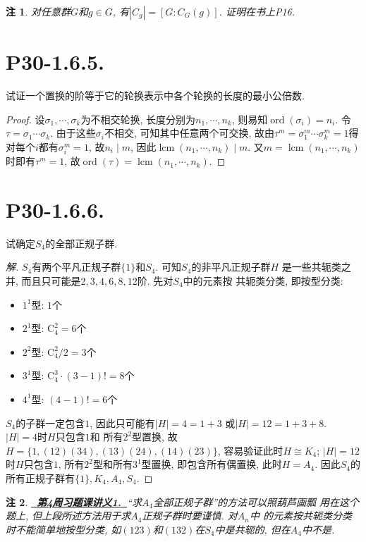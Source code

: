 \documentclass[12pt, a4paper, fontset=windows]{ctexart}
\newcommand{\abs}[1]{\left|{#1}\right|}
\newcommand{\isom}{\cong} %
\newcommand{\lcm}{\operatorname{lcm}}
\newcommand{\myref}[2][]{\hyperref[#1]{\bf\color{blue}\ {#2}\ }}
\newcommand{\ord}{\operatorname{ord}}
\newcommand{\yh}[1]{“{#1}”} %
\newtheorem*{remark}{注}
\newenvironment{solution}{\begin{proof}[解]}{\end{proof}}
\begin{document}
\begin{remark}
对任意群$G$和$g\in G$, 有$\abs{C_g}=[G:C_G(g)]$. 证明在书上{\rm P16.\cite{jsds}}
\end{remark}

\section*{P30-1.6.5.}

试证一个置换的阶等于它的轮换表示中各个轮换的长度的最小公倍数. 

\begin{proof}
设$\sigma_1,\cdots,\sigma_k$为不相交轮换, 长度分别为$n_1,\cdots,n_k$, 
则易知$\ord(\sigma_i)=n_i$. 令$\tau=\sigma_1\cdots\sigma_k$. 
由于这些$\sigma_i$不相交, 可知其中任意两个可交换, 
故由$\tau^m=\sigma_1^m\cdots\sigma_k^m=1$得
对每个$i$都有$\sigma_i^m=1$, 故$n_i\mid m$, 
因此$\lcm(n_1,\cdots,n_k)\mid m$. 又$m=\lcm(n_1,\cdots,n_k)$
时即有$\tau^m=1$, 故$\ord(\tau)=\lcm(n_1,\cdots,n_k)$. 
\end{proof}

\section*{P30-1.6.6.}

试确定$S_4$的全部正规子群. 

\begin{solution}
$S_4$有两个平凡正规子群$\{1\}$和$S_4$. 可知$S_4$的非平凡正规子群$H$
是一些共轭类之并, 而且只可能是$2,3,4,6,8,12$阶. 先对$S_4$中的元素按
共轭类分类, 即按型分类: 
\begin{itemize}[itemsep=0pt]
    \item $1^1$型: $1$个
    \item $2^1$型: $\mathrm{C}^2_4=6$个
    \item $2^2$型: $\mathrm{C}^2_4/2=3$个
    \item $3^1$型: $\mathrm{C}^3_4\cdot(3-1)!=8$个
    \item $4^1$型: $(4-1)!=6$个
\end{itemize}

$S_4$的子群一定包含$1$, 因此只可能有$\abs{H}=4=1+3$
或$\abs{H}=12=1+3+8$. $\abs{H}=4$时$H$只包含$1$和
所有$2^2$型置换, 故$H=\{1,(12)(34),
(13)(24),(14)(23)\}$, 容易验证此时$H\isom K_4$; 
$\abs{H}=12$时$H$只包含$1$, 所有$2^2$型和所有$3^1$型置换, 
即包含所有偶置换, 此时$H=A_4$. 
因此$S_4$的所有正规子群有$\{1\},K_4,A_4,S_4$. 
\end{solution}

\begin{remark}
\myref[A4-lhd]{第4周习题课讲义1.}\yh{求$A_4$全部正规子群}的方法可以照葫芦画瓢
用在这个题上, 但上段所述方法用于求$A_4$正规子群时要谨慎. 对$A_n$中
的元素按共轭类分类时不能简单地按型分类, 
如$(123)$和$(132)$在$S_4$中是共轭的, 但在$A_4$中不是. 
\end{remark}
\end{document}
